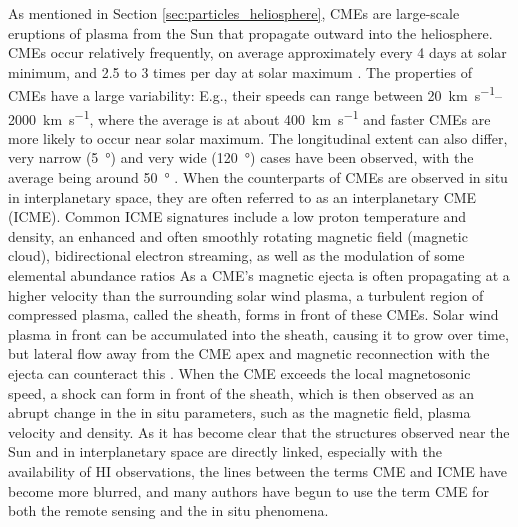 As mentioned in Section \ref{sec:particles_heliosphere}, \acp{CME} are large-scale eruptions of plasma from the Sun that propagate outward into the heliosphere. CMEs occur relatively frequently, on average approximately every 4 days at solar minimum, and 2.5 to 3 times per day at solar maximum \citep{Webb-1994}. The properties of CMEs have a large variability: E.g., their speeds can range between \SIrange[range-phrase={\,and\,}]{20}{2000}{\kilo\meter\per\second}, where the average is at about \SI{400}{\kilo\meter\per\second} and faster CMEs are more likely to occur near solar maximum. The longitudinal extent can also differ, very narrow (\SI{5}{\degree}) and very wide (\SI{120}{\degree}) cases have been observed, with the average being around \SI{50}{\degree} \citep{Cane-2000}.
When the counterparts of \acp{CME} are observed in situ in interplanetary space, they are often referred to as an interplanetary \ac{CME} (\acs{ICME}). Common \ac{ICME} signatures include a low proton temperature and density, an enhanced and often smoothly rotating magnetic field (magnetic cloud), bidirectional electron streaming, as well as the modulation of some elemental abundance ratios \citep{Richardson-Cane-1995,Zurbuchen-2006-insitu-signatures,Wimmer-Schweingruber2006}
As a \ac{CME}'s magnetic ejecta is often propagating at a higher velocity than the surrounding solar wind plasma, a turbulent region of compressed plasma, called the sheath, forms in front of these \acp{CME}. Solar wind plasma in front can be accumulated into the sheath, causing it to grow over time, but lateral flow away from the CME apex and magnetic reconnection with the ejecta can counteract this \citep[see e.g.]{Janvier-2019,Siscoe2008,Manchester2005}. When the \ac{CME} exceeds the local magnetosonic speed, a shock can form in front of the sheath, which is then observed as an abrupt change in the in situ parameters, such as the magnetic field, plasma velocity and density.
As it has become clear that the structures observed near the Sun and in interplanetary space are directly linked, especially with the availability of \ac{HI} observations, the lines between the terms \ac{CME} and \ac{ICME} have become more blurred, and many authors have begun to use the term \ac{CME} for both the remote sensing and the in situ phenomena.

